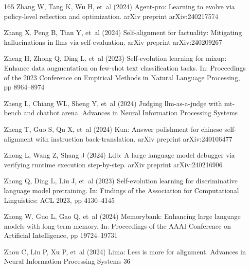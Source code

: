 \documentclass[sn-basic, Numbered]{sn-jnl}%
\theoremstyle{thmstyleone}%
\theoremstyle{thmstyletwo}%
\theoremstyle{thmstylethree}%
\begin{document}
\begin{thebibliography}{165}
Zhang W, Tang K, Wu H, et~al (2024{}) Agent-pro: Learning to evolve via policy-level reflection and optimization. arXiv preprint arXiv:240217574

Zhang X, Peng B, Tian Y, et~al (2024{}) Self-alignment for factuality: Mitigating hallucinations in llms via self-evaluation. arXiv preprint arXiv:240209267

Zheng H, Zhong Q, Ding L, et~al (2023) Self-evolution learning for mixup: Enhance data augmentation on few-shot text classification tasks. In: Proceedings of the 2023 Conference on Empirical Methods in Natural Language Processing, pp 8964--8974

Zheng L, Chiang WL, Sheng Y, et~al (2024{}) Judging llm-as-a-judge with mt-bench and chatbot arena. Advances in Neural Information Processing Systems

Zheng T, Guo S, Qu X, et~al (2024{}) Kun: Answer polishment for chinese self-alignment with instruction back-translation. arXiv preprint arXiv:240106477

Zhong L, Wang Z, Shang J (2024{}) Ldb: A large language model debugger via verifying runtime execution step-by-step. arXiv preprint arXiv:240216906

Zhong Q, Ding L, Liu J, et~al (2023) Self-evolution learning for discriminative language model pretraining. In: Findings of the Association for Computational Linguistics: ACL 2023, pp 4130--4145

Zhong W, Guo L, Gao Q, et~al (2024{}) Memorybank: Enhancing large language models with long-term memory. In: Proceedings of the AAAI Conference on Artificial Intelligence, pp 19724--19731

Zhou C, Liu P, Xu P, et~al (2024{}) Lima: Less is more for alignment. Advances in Neural Information Processing Systems 36


\end{thebibliography}
\end{document}
